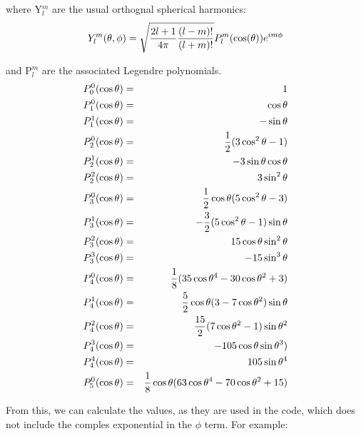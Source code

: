 where Y$_l^m$ are the usual orthognal spherical harmonics:\\

\begin{equation}
Y_l^m(\theta, \phi) = \sqrt{ {2 l + 1 \over 4 \pi} {(l - m)! \over (l + m)!}}
P_l^m(\cos(\theta)) e^{i m \phi}
\end{equation}

and P$_l^m$ are the associated Legendre polynomials.\\
\begin{eqnarray}
P_0^0(\cos \theta)      &=&     1\nonumber\\
P_1^0(\cos \theta)      &=&     \cos \theta\nonumber\\
P_1^1(\cos \theta)      &=&     -\sin \theta\nonumber\\
P_2^0(\cos \theta)      &=&     {1 \over 2} (3 \cos^2 \theta - 1)\nonumber\\
P_2^1(\cos \theta)      &=&     -3\sin \theta\cos \theta\nonumber\\
P_2^2(\cos \theta)      &=&     3 \sin^2 \theta\nonumber\\
P_3^0(\cos \theta)      &=&     {1 \over 2}\cos \theta(5 \cos^2 \theta - 3)\nonumber\\
P_3^1(\cos \theta)      &=&     -{3 \over2} (5 \cos^2 \theta - 1)\sin \theta\nonumber\\
P_3^2(\cos \theta)      &=&     15\cos \theta \sin^2 \theta\nonumber\\
P_3^3(\cos \theta)      &=&     -15 \sin^3 \theta\nonumber\\
P_4^0(\cos\theta)       &=&     {1 \over 8}(35\cos\theta^4-30\cos\theta^2+3)\nonumber\\
P_4^1(\cos\theta)       &=&     {5 \over 2} \cos\theta(3-7\cos\theta^2)\sin\theta\nonumber\\
P_4^2(\cos\theta)       &=&     {15 \over 2} (7\cos\theta^2-1)\sin\theta^2\nonumber\\
P_4^3(\cos\theta)       &=&     -105 \cos\theta \sin\theta^3)\nonumber\\
P_4^4(\cos\theta)       &=&     105 \sin\theta^4\nonumber\\
P_5^0(\cos\theta)       &=&     {1 \over 8} \cos\theta(63\cos\theta^4-70\cos\theta^2+15)\nonumber\\
\end{eqnarray}

From this, we can calculate the values, as they are used in the code, which
does not include the comples exponential in the $\phi$ term. For example:\\


